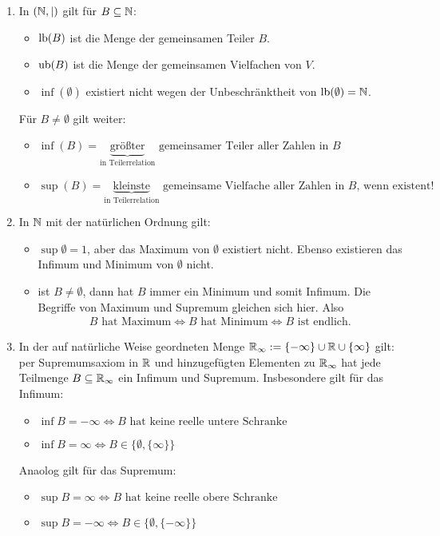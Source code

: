 \documentclass[../../main.tex]{subfiles}
\begin{document}
\begin{bsp}
\begin{enumerate}[\normalfont(a)]
\begin{table}[H]
\end{table}
\item In $(\mathbb N, \mid)$ gilt für $B\subseteq \mathbb N$:
\begin{itemize}
\item $\operatorname{lb}(B)$ ist die Menge der gemeinsamen Teiler $B$.
\item $\operatorname{ub}(B)$ ist die Menge der gemeinsamen Vielfachen von $V$.
\item $\inf(\emptyset)$ existiert nicht wegen der Unbeschränktheit von $\operatorname{lb}(\emptyset)=\mathbb N$.
\end{itemize}
Für $B\neq \emptyset$ gilt weiter:
\begin{itemize}
	\item $\inf(B)=\underbrace{\text{größter}}_{\text{in Teilerrelation}} \text{ gemeinsamer Teiler aller Zahlen in }B$
	\item $\sup(B)=\underbrace{\text{kleinste}}_{\text{in Teilerrelation}} \text{ gemeinsame Vielfache aller Zahlen in }B\text{, wenn existent!}$
\end{itemize}		
\item In $\mathbb N$ mit der natürlichen Ordnung gilt:
\begin{itemize}
\item $\sup\emptyset=1$, aber das Maximum von $\emptyset$ existiert nicht. Ebenso existieren das Infimum und Minimum von $\emptyset$ nicht.
\item ist $B\neq\emptyset$, dann hat $B$ immer ein Minimum und somit Infimum. Die Begriffe von Maximum und Supremum gleichen sich hier. Also
\begin{align*}
B\text{ hat Maximum}\Longleftrightarrow B\text{ hat Minimum}\Longleftrightarrow B\text{ ist endlich}.
\end{align*}
\end{itemize}
\item In der auf natürliche Weise geordneten Menge $\mathbb R_\infty:=\{-\infty\}\cup\mathbb R\cup\{\infty\}$ gilt: per Supremumsaxiom in $\mathbb R$ und hinzugefügten Elementen zu $\mathbb R_\infty$ hat jede Teilmenge $B\subseteq\mathbb R_\infty$ ein Infimum und Supremum. Insbesondere gilt für das Infimum:
\begin{itemize}
\item $\inf B=-\infty\Longleftrightarrow B\text{ hat keine reelle untere Schranke}$
\item $\inf B=\infty\Longleftrightarrow B\in\{\emptyset,\{\infty\}\}$
\end{itemize}
Anaolog gilt für das Supremum:
\begin{itemize}
\item $\sup B=\infty\Longleftrightarrow B\text{ hat keine reelle obere Schranke}$
\item $\sup B=-\infty\Longleftrightarrow B\in\{\emptyset,\{-\infty\}\}$
\end{itemize}
\end{enumerate}
\end{bsp}
\end{document}
